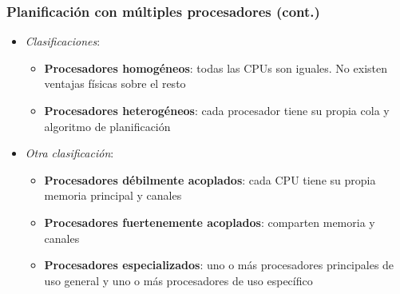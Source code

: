 \begin{frame}
  \frametitle{Planificación con múltiples procesadores (cont.)}
	\begin{itemize}		
		\item \emph{Clasificaciones}:
		\begin{itemize}
			\item \textbf{Procesadores homogéneos}: todas las CPUs son iguales. No existen ventajas físicas sobre el resto
			\item \textbf{Procesadores heterogéneos}: cada procesador tiene su propia cola y algoritmo de planificación
		\end{itemize}
		\item \emph{Otra clasificación}:
		\begin{itemize}
			\item \textbf{Procesadores débilmente acoplados}: cada CPU tiene su propia memoria principal y canales
			\item \textbf{Procesadores fuertenemente acoplados}: comparten memoria y canales
			\item \textbf{Procesadores especializados}: uno o más procesadores principales de uso general y uno o más procesadores de uso específico
		\end{itemize}		
	\end{itemize}
\end{frame}